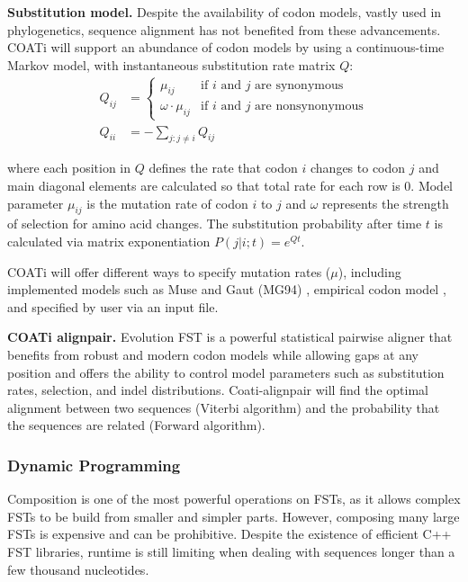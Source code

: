 \textbf{Substitution model.}
Despite the availability of codon models, vastly used in phylogenetics, sequence
alignment has not benefited from these advancements.
COATi will support an abundance of codon models by using a continuous-time
Markov model, with instantaneous substitution rate matrix $Q$:
\begin{align*} Q_{ij} &= \begin{cases}
    \mu_{ij} & \text{if $i$ and $j$ are synonymous}\\
    \omega \cdot \mu_{ij} & \text{if $i$ and $j$ are nonsynonymous}
    \end{cases}\\[10pt]
   Q_{ii} &= -\sum_{j:j \neq i} Q_{ij}
\end{align*}

where each position in $Q$ defines the rate that codon $i$ changes to codon $j$
and main diagonal elements are calculated so that total rate for each row is 0.
Model parameter $\mu_{ij}$ is the mutation rate of codon $i$ to $j$ and $\omega$
represents the strength of selection for amino acid changes.
The substitution probability after time $t$ is calculated via matrix
exponentiation $P(j|i;t) = e^{Qt}$.

COATi will offer different ways to specify mutation rates ($\mu$), including
implemented models such as Muse and Gaut (MG94) , empirical codon model
, and specified by user via an input file.

\textbf{COATi alignpair.}
Evolution FST is a powerful statistical pairwise aligner that benefits from
robust and modern codon models while allowing gaps at any position and offers
the ability to control model parameters such as substitution rates, selection,
and indel distributions.
Coati-alignpair will find the optimal alignment between two sequences (Viterbi
algorithm) and the probability that the sequences are related (Forward algorithm).

\subsubsection{Dynamic Programming}
Composition is one of the most powerful operations on FSTs, as it allows complex
FSTs to be build from smaller and simpler parts.
However, composing many large FSTs is expensive and can be prohibitive.
Despite the existence of efficient C++ FST libraries, runtime is still limiting
when dealing with sequences longer than a few thousand nucleotides.

